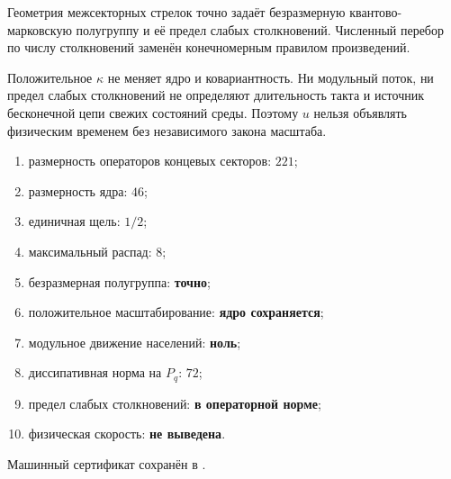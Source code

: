 \begin{theorem}
Геометрия межсекторных стрелок точно задаёт безразмерную квантово-марковскую
полугруппу и её предел слабых столкновений. Численный перебор по числу
столкновений заменён конечномерным правилом произведений.
\end{theorem}

\begin{nogocriterion}
Положительное $\kappa$ не меняет ядро и ковариантность. Ни модульный поток,
ни предел слабых столкновений не определяют длительность такта и источник бесконечной
цепи свежих состояний среды. Поэтому $u$ нельзя объявлять физическим
временем без независимого закона масштаба.
\end{nogocriterion}

\begin{protocol}
\begin{enumerate}
 \item размерность операторов концевых секторов: \textbf{$221$};
 \item размерность ядра: \textbf{$46$};
 \item единичная щель: \textbf{$1/2$};
 \item максимальный распад: \textbf{$8$};
 \item безразмерная полугруппа: \textbf{точно};
 \item положительное масштабирование: \textbf{ядро сохраняется};
 \item модульное движение населений: \textbf{ноль};
 \item диссипативная норма на $P_q$: \textbf{$72$};
 \item предел слабых столкновений: \textbf{в операторной норме};
 \item физическая скорость: \textbf{не выведена}.
\end{enumerate}
\end{protocol}

Машинный сертификат сохранён в
.